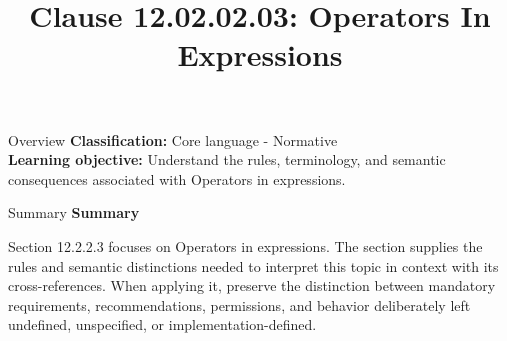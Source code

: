 \documentclass[10pt,letterpaper]{article}
\title{Clause 12.02.02.03: Operators In Expressions}
\author{}
\date{}
\begin{document}
\maketitle
\begin{CornellOverviewBox}{Overview}
\textbf{Classification:} Core language - Normative\\[2pt]
\textbf{Learning objective:} Understand the rules, terminology, and semantic consequences associated with Operators in expressions.
\end{CornellOverviewBox}\begin{CornellSummaryBox}{Summary}
{\sffamily\bfseries\color{Accent} Summary}\par\vspace{3pt}Section 12.2.2.3 focuses on Operators in expressions. The section supplies the rules and semantic distinctions needed to interpret this topic in context with its cross-references. When applying it, preserve the distinction between mandatory requirements, recommendations, permissions, and behavior deliberately left undefined, unspecified, or implementation-defined.
\end{CornellSummaryBox}
\end{document}
